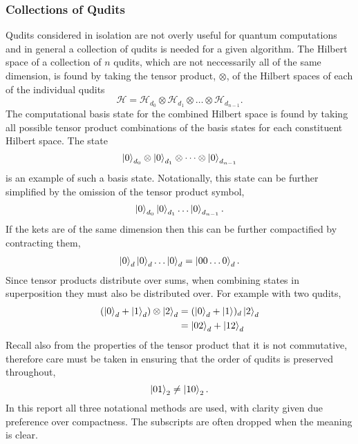 \subsubsection{Collections of Qudits}
\label{subsubsection:collections_qbits}
Qudits considered in isolation are not overly useful for quantum computations and in general a collection of qudits is needed for a given algorithm.
The Hilbert space of a collection of $n$ qudits, which are not neccessarily all of the same dimension, is found by taking the tensor product, $\otimes$, of the Hilbert spaces of each of the individual qudits
\begin{equation}
    \mathcal{H} = \mathcal{H}_{d_0} \otimes \mathcal{H}_{d_1} \otimes \dots \otimes \mathcal{H}_{d_{n-1}}.
\end{equation}
The computational basis state for the combined Hilbert space is found by taking all possible tensor product combinations of the basis states for each constituent Hilbert space.
The state 
\begin{equation}
    \ket{0}_{d_0}\otimes\ket{0}_{d_1}\otimes\dots\otimes\ket{0}_{d_{n-1}}
\end{equation}
is an example of such a basis state.
Notationally, this state can be further simplified by the omission of the tensor product symbol,
\begin{equation}
    \ket{0}_{d_0}\ket{0}_{d_1}\dots\ket{0}_{d_{n-1}}.
\end{equation}
If the kets are of the same dimension then this can be further compactified by contracting them,
\begin{align}
    \ket{0}_{d}\ket{0}_{d}\dots\ket{0}_{d} = \ket{00\dots0}_d.
\end{align}
Since tensor products distribute over sums, when combining states in superposition they must also be distributed over.
For example with two qudits,
\begin{align}
    (\ket{0}_d + \ket{1}_d)\otimes\ket{2}_d &= (\ket{0}_d + \ket{1})_d\ket{2}_d\\
    &= \ket{02}_d + \ket{12}_d
\end{align}
Recall also from the properties of the tensor product that it is not commutative, therefore care must be taken in ensuring that the order of qudits is preserved throughout,
\begin{equation}
    \ket{01}_2 \neq \ket{10}_2.
\end{equation}
In this report all three notational methods are used, with clarity given due preference over compactness.
The subscripts are often dropped when the meaning is clear.

